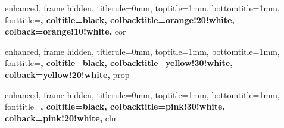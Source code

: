 {
    enhanced,
    frame hidden,
    titlerule=0mm,
    toptitle=1mm,
    bottomtitle=1mm,
    fonttitle=\bfseries\large,
    coltitle=black,
    colbacktitle=orange!20!white,
    colback=orange!10!white,
}{cor}


\newenvironment{corpf}{
    \begin{tcolorbox}[kb/accent proof={orange!80!black}{Proof for Corollary.}]
}{
    \hfill\textcolor{orange!80!black}{$\blacksquare$}
    \end{tcolorbox}
}

\NewDocumentCommand{\corp}{m+m+m}{
    \begin{mycorollary}{}{}
        #1
    \end{mycorollary}

    \begin{corpf}
        #2
    \end{corpf}
}

{
    enhanced,
    frame hidden,
    titlerule=0mm,
    toptitle=1mm,
    bottomtitle=1mm,
    fonttitle=\bfseries\large,
    coltitle=black,
    colbacktitle=yellow!30!white,
    colback=yellow!20!white,
}{prop}


\newenvironment{proppf}{
    \begin{tcolorbox}[kb/accent proof={Goldenrod!85!black}{Proof for Proposition.}]
}{
    \hfill\textcolor{Goldenrod!85!black}{$\blacksquare$}
    \end{tcolorbox}
}

\NewDocumentCommand{\propp}{+m+m}{
    \begin{myproposition}{}{}
        #1
    \end{myproposition}

    \begin{proppf}
        #2
    \end{proppf}
}

{
    enhanced,
    frame hidden,
    titlerule=0mm,
    toptitle=1mm,
    bottomtitle=1mm,
    fonttitle=\bfseries\large,
    coltitle=black,
    colbacktitle=pink!30!white,
    colback=pink!20!white,
}{clm}


